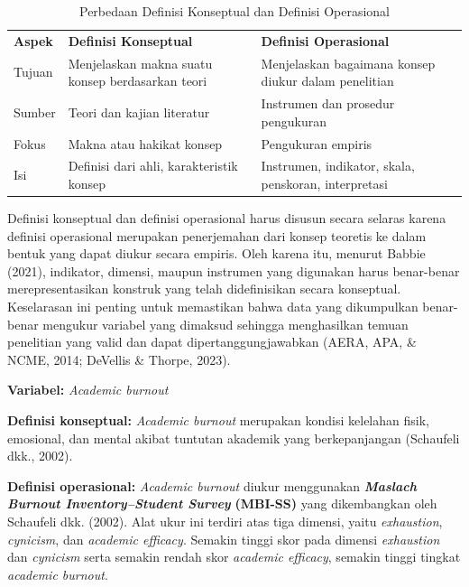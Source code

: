 \documentclass[
  indonesian,
  letterpaper,
  DIV=11,
  numbers=noendperiod]{scrreprt}
\begin{document}
\begin{longtable}[]{@{}
  >{\raggedright\arraybackslash}p{}
  >{\raggedright\arraybackslash}p{}
  >{\raggedright\arraybackslash}p{}@{}}
\caption{Perbedaan Definisi Konseptual dan Definisi
Operasional}\label{tbl-definisi}\tabularnewline
\toprule\noalign{}
\endfirsthead
\endhead
\bottomrule\noalign{}
\endlastfoot
\textbf{Aspek} & \textbf{Definisi Konseptual} & \textbf{Definisi
Operasional} \\
Tujuan & Menjelaskan makna suatu konsep berdasarkan teori & Menjelaskan
bagaimana konsep diukur dalam penelitian \\
Sumber & Teori dan kajian literatur & Instrumen dan prosedur
pengukuran \\
Fokus & Makna atau hakikat konsep & Pengukuran empiris \\
Isi & Definisi dari ahli, karakteristik konsep & Instrumen, indikator,
skala, penskoran, interpretasi \\
\end{longtable}

Definisi konseptual dan definisi operasional harus disusun secara
selaras karena definisi operasional merupakan penerjemahan dari konsep
teoretis ke dalam bentuk yang dapat diukur secara empiris. Oleh karena
itu, menurut Babbie (2021), indikator, dimensi, maupun instrumen yang
digunakan harus benar-benar merepresentasikan konstruk yang telah
didefinisikan secara konseptual. Keselarasan ini penting untuk
memastikan bahwa data yang dikumpulkan benar-benar mengukur variabel
yang dimaksud sehingga menghasilkan temuan penelitian yang valid dan
dapat dipertanggungjawabkan (AERA, APA, \& NCME, 2014; DeVellis \&
Thorpe, 2023).

\begin{tcolorbox}[enhanced jigsaw, colframe=quarto-callout-tip-color-frame, toptitle=1mm, breakable, leftrule=.75mm, arc=.35mm, toprule=.15mm, colback=white, colbacktitle=quarto-callout-tip-color!10!white, bottomtitle=1mm, bottomrule=.15mm, titlerule=0mm, title={Contoh Operasionalisasi Variabel}, coltitle=black, left=2mm, opacitybacktitle=0.6, opacityback=0, rightrule=.15mm]

\textbf{Variabel:} \emph{Academic burnout}

\textbf{Definisi konseptual:} \emph{Academic burnout} merupakan kondisi
kelelahan fisik, emosional, dan mental akibat tuntutan akademik yang
berkepanjangan (Schaufeli dkk., 2002).

\textbf{Definisi operasional:} \emph{Academic burnout} diukur
menggunakan \textbf{\emph{Maslach Burnout Inventory--Student Survey}}
\textbf{(MBI-SS)} yang dikembangkan oleh Schaufeli dkk. (2002). Alat
ukur ini terdiri atas tiga dimensi, yaitu \emph{exhaustion},
\emph{cynicism}, dan \emph{academic efficacy}. Semakin tinggi skor pada
dimensi \emph{exhaustion} dan \emph{cynicism} serta semakin rendah skor
\emph{academic efficacy}, semakin tinggi tingkat \emph{academic
burnout}.

\end{tcolorbox}
\end{document}
